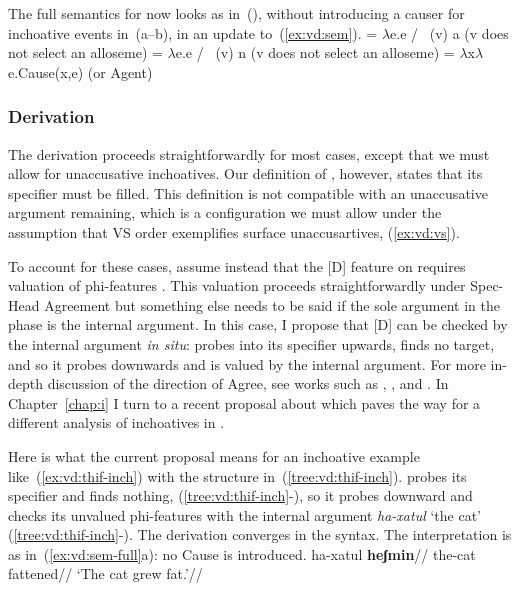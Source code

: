 The full semantics for {\vd} now looks as in~(\nextx), without introducing a causer for inchoative events in~(\nextx a--b), in an update to~(\ref{ex:vd:sem}).
\pex\label{ex:vd:sem-full}
	\a \denote{\vd} = $\lambda$e.e / \trace~(v) a \hfill (v does not select an alloseme)
	\a \denote{\vd} = $\lambda$e.e / \trace~(v) n \hfill (v does not select an alloseme)
	\a \denote{\vd} = $\lambda$x$\lambda$e.Cause(x,e) \hfill (or Agent)
\xe


		\subsubsection{Derivation}
The derivation proceeds straightforwardly for most cases, except that we must allow for unaccusative inchoatives. Our definition of {\vd}, however, states that its specifier must be filled. This definition is not compatible with an unaccusative argument remaining, which is a configuration we must allow under the assumption that VS order exemplifies surface unaccusartives, (\ref{ex:vd:vs}).

To account for these cases, assume instead that the [D] feature on {\vd} requires valuation of phi-features \citep{nie17,schaefer17oup}. This valuation proceeds straightforwardly under Spec-Head Agreement but something else needs to be said if the sole argument in the phase is the internal argument. In this case, I propose that [D] can be checked by the internal argument \emph{in situ}: {\vd} probes into its specifier upwards, finds no target, and so it probes downwards and is valued by the internal argument. For more in-depth discussion of the direction of Agree, see works such as \cite{bejarrezac09}, \cite{zeijlstra12}, \cite{preminger13tlr} and \cite{deal15nels}. In Chapter~\ref{chap:i} I turn to a recent proposal about {\vd} which paves the way for a different analysis of inchoatives in {\thif}.

Here is what the current proposal means for an inchoative example like~(\ref{ex:vd:thif-inch}) with the structure in~(\ref{tree:vd:thif-inch}). {\vd} probes its specifier and finds nothing, (\ref{tree:vd:thif-inch}-), so it probes downward and checks its unvalued phi-features with the internal argument \emph{ha-xatul} `the cat' (\ref{tree:vd:thif-inch}-). The derivation converges in the syntax. The interpretation is as in~(\ref{ex:vd:sem-full}a): no Cause is introduced.
\ex\label{ex:vd:thif-inch} \begingl
	\gla ha-xatul \textbf{heʃmin}//
	\glb the-cat fattened//
	\glft `The cat grew fat.'//
	\endgl
\xe
	
